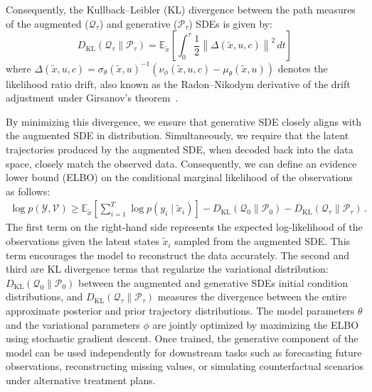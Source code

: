 \documentclass[preprint,12pt]{elsarticle}
\begin{document}
Consequently, the Kullback–Leibler (KL) divergence between the path measures of the augmented ($\mathcal{Q}_\tau$) and generative  ($\mathcal{P}_\tau$) SDEs is given by:
\begin{equation}
D_{\mathrm{KL}}(\mathcal{Q}_\tau \parallel \mathcal{P}_\tau) = \mathbb{E}_{\tilde{x}} \left[ \int_0^\tau \frac{1}{2} \left\| \Delta(\tilde{x}, u, c) \right\|^2 \, dt \right]
\end{equation}
where \( \Delta(\tilde{x}, u, c) = \sigma_\theta(\tilde{x}, u)^{-1} \left( \nu_\phi(\tilde{x}, u, c) - \mu_\theta(\tilde{x}, u) \right) \) denotes the likelihood ratio drift, also known as the Radon--Nikodym derivative
of the drift adjustment under Girsanov's theorem~\citep{kallenberg1997foundations}. 

By minimizing this divergence, we ensure that generative SDE closely aligns with the augmented SDE in distribution. Simultaneously, we require that the latent trajectories produced by the augmented SDE, when decoded back into the data space, closely match the observed data. 
Consequently, we can define an evidence lower bound (ELBO) on the conditional marginal likelihood of the observations as follows: 
\begin{align}
\log p(\mathcal{Y}, \mathcal{V}) \geq
\mathbb{E}_{\tilde{x}} \left[
\sum_{i=1}^{T} \log p(y_i \mid \tilde{x}_i) 
\right]
- D_{\mathrm{KL}}(\mathcal{Q}_0 \| \mathcal{P}_0) - D_{\mathrm{KL}}(\mathcal{Q}_\tau \| \mathcal{P}_\tau) \, .
\end{align}
The first term on the right-hand side represents the expected log-likelihood of the observations given the latent states $\tilde{x}_i$ sampled from the augmented SDE. This term encourages the model to reconstruct the data accurately. The second and third are KL divergence terms that regularize the variational distribution: $D_{\mathrm{KL}}(\mathcal{Q}_0 \parallel \mathcal{P}_0)$ between the augmented and generative SDEs initial condition distributions, and $D_\mathrm{KL}(\mathcal{Q}_\tau \parallel \mathcal{P}_\tau)$ measures the divergence between the entire approximate posterior and prior trajectory distributions. 
The model parameters  $\theta$ and the variational parameters $\phi$ are jointly optimized by maximizing the ELBO using stochastic gradient descent. Once trained, the generative component of the model can be used independently for downstream tasks such as forecasting future observations, reconstructing missing values, or simulating counterfactual scenarios under alternative treatment plans.
\end{document}
